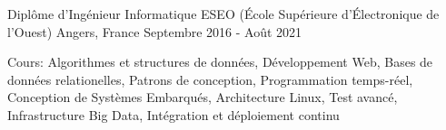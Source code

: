 

\begin{cventries}

  \cventry
    {Diplôme d'Ingénieur Informatique} %
    {ESEO (École Supérieure d'Électronique de l'Ouest)} %
    {Angers, France} %
    {Septembre 2016 - Août 2021} %
    {
      \begin{cvitems} %
        \item {Cours: Algorithmes et structures de données, Développement Web, Bases de données relationelles, Patrons de conception, Programmation temps-réel, Conception de Systèmes Embarqués, Architecture Linux, Test avancé, Infrastructure Big Data, Intégration et déploiement continu}
      \end{cvitems}
    }

\end{cventries}
